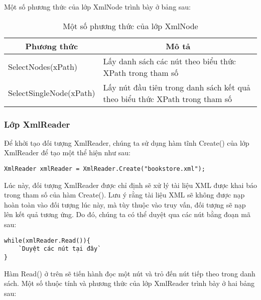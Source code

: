 Một số phương thức của lớp XmlNode trình bày ở bảng sau:

\begin{center}
\begin{longtable}{|m{5cm}|m{6cm}|}
\caption [Một số phương thức của lớp XmlNode]{Một số phương thức của lớp XmlNode}
   \endfirsthead
   \endhead
\hline
\multicolumn{1}{|c|}{\textbf{Phương thức}} &\multicolumn{1}{|c|}{	\textbf{Mô tả}}\\ \hline
SelectNodes(xPath) &	Lấy danh sách các nút theo biểu thức XPath trong tham số\\ \hline
SelectSingleNode(xPath) &	Lấy nút đầu tiên trong danh sách kết quả theo biểu thức XPath trong tham số\\ \hline

\end{longtable}
\end{center}
\vspace{-1cm}
\subsubsection{Lớp XmlReader}
Để khởi tạo đối tượng XmlReader, chúng ta sử dụng hàm tĩnh Create() của lớp XmlReader để tạo một thể hiện như sau:
\lstset{language=XML}
\begin{lstlisting}[escapechar=`]
	XmlReader xmlReader = XmlReader.Create("bookstore.xml");
\end{lstlisting}

Lúc này, đối tượng XmlReader được chỉ định sẽ xử lý tài liệu XML được khai báo trong tham số của hàm Create(). Lưu ý rằng tài liệu XML sẽ không được nạp hoàn toàn vào đối tượng lúc này, mà tùy thuộc vào truy vấn, đối tượng sẽ nạp lên kết quả tương ứng. Do đó, chúng ta có thể duyệt qua các nút bằng đoạn mã sau:
\lstset{language=C++}
\begin{lstlisting}[escapechar=`]
while(xmlReader.Read()){
	`Duyệt các nút tại đây`
}
\end{lstlisting}
Hàm Read() ở trên sẽ tiến hành đọc một nút và trỏ đến nút tiếp theo trong danh sách.
Một số thuộc tính và phương thức  của lớp XmlReader trình bày ở hai bảng sau:

